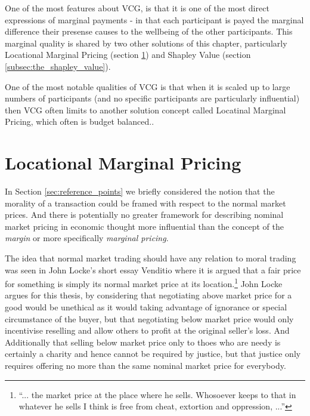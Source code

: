 One of the most features about VCG, is that it is one of the most direct expressions of marginal payments - in that each participant is payed the marginal difference their presense causes to the wellbeing of the other participants.
This marginal quality is shared by two other solutions of this chapter, particularly Locational Marginal Pricing (section \ref{sec:solutions_LMP}) and Shapley Value (section \ref{subsec:the_shapley_value}).

One of the most notable qualities of VCG is that when it is scaled up to large numbers of participants (and no specific participants are particularly influential) then VCG often limits to another solution concept called Locatinal Marginal Pricing, which often is budget balanced.\cite{NATH2019673, 8430852}.


\section{Locational Marginal Pricing}\label{sec:solutions_LMP}

In Section \ref{sec:reference_points} we briefly considered the notion that %
the morality of a transaction could be framed with respect to the normal market prices.
And there is potentially no greater framework for describing nominal market pricing in economic thought more influential than the concept of the \textit{margin} or more specifically \textit{marginal pricing}.

The idea that normal market trading should have any relation to moral trading was seen in John Locke's short essay Venditio \cite{locke2003locke} where it is argued that a fair price for something is simply its normal market price at its location.\footnote{``... the market price at the place where he sells. Whosoever keeps to that in whatever he sells I think is free from cheat, extortion and oppression, ...''}
John Locke argues for this thesis, by considering that negotiating above market price for a good would be unethical as it would taking advantage of ignorance or special circumstance of the buyer, but that negotiating below market price would only incentivise reselling and allow others to profit at the original seller's loss.
And Additionally that selling below market price only to thoes who are needy is certainly a charity and hence cannot be required by justice, but that justice only requires offering no more than the same nominal market price for everybody.

